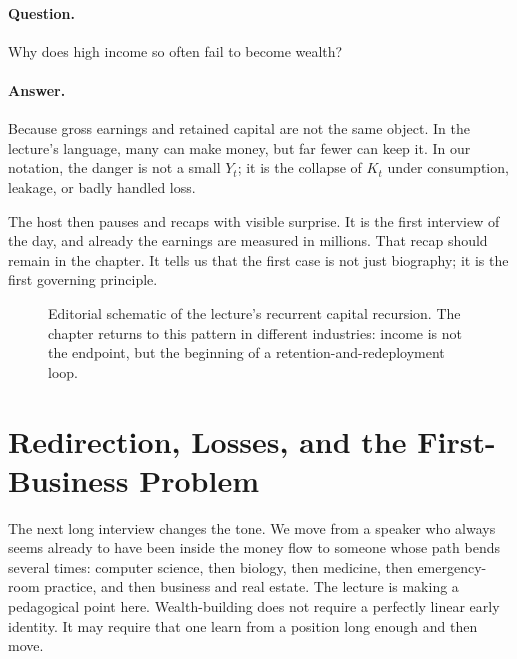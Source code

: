 \paragraph{Question.} Why does high income so often fail to become wealth?

\paragraph{Answer.} Because gross earnings and retained capital are not the same object. In the lecture's language, many can make money, but far fewer can keep it. In our notation, the danger is not a small \(Y_t\); it is the collapse of \(K_t\) under consumption, leakage, or badly handled loss.

The host then pauses and recaps with visible surprise. It is the first interview of the day, and already the earnings are measured in millions. That recap should remain in the chapter. It tells us that the first case is not just biography; it is the first governing principle.

\begin{figure}
\centering
{}
\caption{Editorial schematic of the lecture's recurrent capital recursion. The chapter returns to this pattern in different industries: income is not the endpoint, but the beginning of a retention-and-redeployment loop.}
\end{figure}

\section{Redirection, Losses, and the First-Business Problem}

The next long interview changes the tone. We move from a speaker who always seems already to have been inside the money flow to someone whose path bends several times: computer science, then biology, then medicine, then emergency-room practice, and then business and real estate. The lecture is making a pedagogical point here. Wealth-building does not require a perfectly linear early identity. It may require that one learn from a position long enough and then move.

